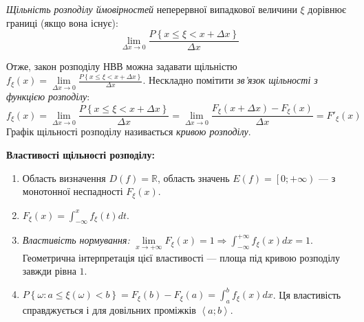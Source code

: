\begin{definition}
    \emph{Щільність розподілу ймовірностей} неперервної випадкової величини $\xi$
    дорівнює границі (якщо вона існує):
    \begin{equation}\label{eq:prob_dens}
        \lim_{\Delta x\rightarrow 0} \frac{P\left\{x\leq \xi < x+\Delta x\right\}}{\Delta x}
    \end{equation}
\end{definition}
Отже, закон розподілу НВВ можна задавати щільністю $f_\xi(x) = \lim\limits_{\Delta x\rightarrow 0} \frac{P\left\{x\leq \xi < x+\Delta x\right\}}{\Delta x}$.
Нескладно помітити \emph{зв'язок щільності з функцією розподілу}:
\begin{equation}\label{eq:dens_pdf}
    f_\xi(x) = \lim\limits_{\Delta x\rightarrow 0} \frac{P\left\{x\leq \xi < x+\Delta x\right\}}{\Delta x} = 
    \lim\limits_{\Delta x\rightarrow 0} \frac{F_\xi(x+\Delta x) - F_\xi(x)}{\Delta x} = F'_\xi(x)
\end{equation}
Графік щільності розподілу називається \emph{кривою розподілу}.

\noindent \textbf{Властивості щільності розподілу:}
\begin{enumerate}
    \item Область визначення $D(f) = \mathbb{R}$, область значень $E(f) = \left[0; +\infty\right)$ --- з монотонної неспадності $F_\xi(x)$.
    \item $F_\xi(x)=\int_{-\infty}^x f_\xi(t)dt$.
    \item \emph{Властивість нормування:} $\lim\limits_{x \to +\infty} F_\xi(x) = 1 \Rightarrow \int_{-\infty}^{+\infty} f_\xi(x)dx = 1$.
    Геометрична інтерпретація цієї властивості --- площа під кривою розподілу завжди рівна $1$.
    \item $P\left\{\omega: a \leq \xi(\omega) < b\right\} = F_\xi(b) - F_\xi(a) = \int_a^b f_\xi(x)dx$.
    Ця властивість справджується і для довільних проміжків $\left< a; b\right>$.
\end{enumerate}

